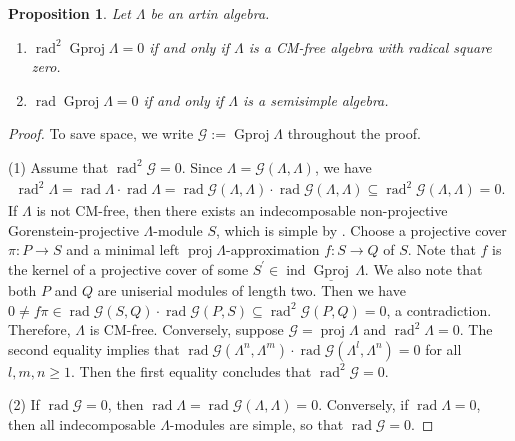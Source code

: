 \documentclass[12pt]{amsart}
\numberwithin{equation}{subsection}
\theoremstyle{plain}
\newtheorem{proposition}[theorem]{Proposition}
\theoremstyle{definition}
\newcommand{\rad}{\operatorname{rad}}
\newcommand{\proj}{\operatorname{proj}}
\newcommand{\Gproj}{\operatorname{Gproj}}
\newcommand{\sGproj}{\underline{\operatorname{Gproj}}\,}
\newcommand{\ind}{\operatorname{ind}}
\renewcommand{\L}{\Lambda}
\begin{document}
\begin{proposition}\label{claim_22}
Let $\L$ be an artin algebra.
\begin{enumerate}
\item $\rad^2\Gproj\L=0$ if and only if  $\L$ is a CM-free algebra with radical square zero.
\item $\rad\Gproj\L=0$  if and only if $\L$ is a semisimple algebra.
\end{enumerate}
\end{proposition}
\begin{proof}
To save space, we write $\mathcal{G}:= \Gproj\L$ throughout the proof. 





(1)
Assume that  $\rad^2\mathcal{G}=0$. 
Since $\L=\mathcal{G}(\L,\L)$, we have 
\begin{align}
\rad^2\L = \rad\L\cdot\rad\L= \rad\mathcal{G}(\L,\L)\cdot\rad\mathcal{G}(\L,\L) \subseteq  \rad^2\mathcal{G}(\L,\L)=0.  
\end{align}
If $\L$ is not CM-free, then there exists an indecomposable non-projective Gorenstein-projective $\L$-module $S$, which is simple by \cite[Lemma 2.1]{X-WChen_2012}.
Choose a projective cover $\pi:P\to S$ and a minimal left $\proj\L$-approximation $f: S \to Q$ of $S$.
Note that $f$ is the kernel of a projective cover of some $S^\prime\in\ind\sGproj\L$.
We also note that both $P$ and $Q$ are uniserial modules of length two.
Then we have $0\neq f\pi \in \rad\mathcal{G}(S, Q)\cdot\rad\mathcal{G}(P,S) \subseteq  \rad^2\mathcal{G}(P,Q)  =0$, a contradiction.
Therefore, $\L$ is CM-free.
Conversely, suppose $\mathcal{G}  = \proj\L$ and $\rad^2\L=0$.
The second equality implies that $\rad\mathcal{G}(\L^n,\L^m)\cdot\rad\mathcal{G}(\L^l,\L^n) = 0$ for all $l,m,n \geq 1$.
Then the first equality concludes that  $\rad^2\mathcal{G}=0$.




(2) 
If  $\rad\mathcal{G}=0$, then $\rad \L = \rad\mathcal{G}(\L,\L)=0$.
Conversely, if $\rad\L=0$, then all indecomposable $\L$-modules are simple, so that $\rad\mathcal{G}=0$.
\end{proof}



\end{document}
